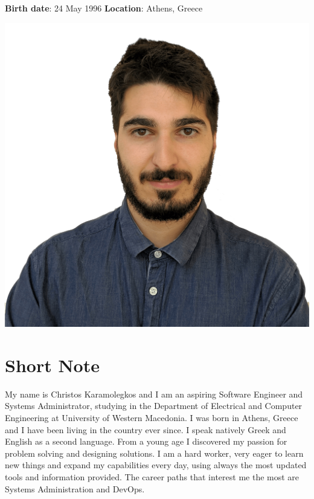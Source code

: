 \documentclass{mycv}
\begin{document}
	\pagestyle{empty}
	\begin{minipage}{.7\textwidth}
		\begin{flushleft}
			\centering
			{\bf Birth date}: 24 May 1996 {\Large\textperiodcentered} {\bf Location}: Athens, Greece
		\end{flushleft}
	\end{minipage}
	\begin{minipage}{.3\textwidth}
		\begin{flushright}
			\includegraphics[scale=0.05]{../assets/christos.png}
		\end{flushright}
	\end{minipage}
	\vspace*{-0.5cm}
	\section{Short Note}
	\textnormal My name is Christos Karamolegkos and I am an aspiring Software Engineer and Systems Administrator, studying in the Department of Electrical and Computer Engineering at University of Western Macedonia. I was born in Athens, Greece and I have been living in the country ever since. I speak natively Greek and English as a second language. From a young age I discovered my passion for problem solving and designing solutions. I am a hard worker, very eager to learn new things and expand my capabilities every day, using always the most updated tools and information provided. The career paths that interest me the most are Systems Administration and DevOps.
	
\end{document}
